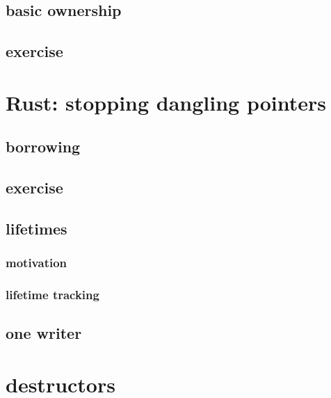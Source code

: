 \subsection{basic ownership}


\subsection{exercise}


\section{Rust: stopping dangling pointers}


\subsection{borrowing}


\subsection{exercise}



\subsection{lifetimes}
\subsubsection{motivation}


\subsubsection{lifetime tracking}


\subsection{one writer}


\section{destructors}


